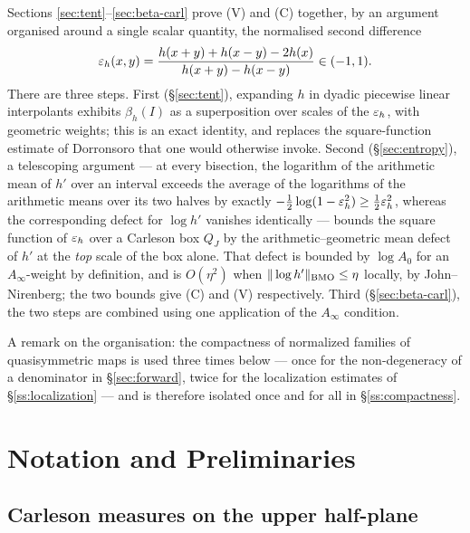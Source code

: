 Sections \ref{sec:tent}--\ref{sec:beta-carl} prove (V) and (C) together, by an
argument organised around a single scalar quantity, the normalised second
difference
\[
\varepsilon_h(x,y)=\frac{h(x+y)+h(x-y)-2h(x)}{h(x+y)-h(x-y)}\in(-1,1).
\]
There are three steps. First (\S\ref{sec:tent}), expanding $h$ in dyadic
piecewise linear interpolants exhibits $\beta_h(I)$ as a superposition over
scales of the $\varepsilon_h$, with geometric weights; this is an exact identity, and
replaces the square-function estimate of Dorronsoro that one would otherwise
invoke. Second (\S\ref{sec:entropy}), a telescoping argument --- at every
bisection, the logarithm of the arithmetic mean of $h'$ over an interval
exceeds the average of the logarithms of the arithmetic means over its two
halves by exactly $-\frac12\log(1-\varepsilon_h^2)\ge\frac12\varepsilon_h^2$, whereas the
corresponding defect for $\log h'$ vanishes identically --- bounds
the square function of $\varepsilon_h$ over a Carleson box $Q_J$ by the
arithmetic--geometric mean defect of $h'$ at the \emph{top} scale of the box
alone. That defect is bounded by $\log A_0$ for an $A_\infty$-weight by
definition, and is $O(\eta^2)$ when $\|\log h'\|_{\mathrm{BMO}}\le\eta$ locally, by
John--Nirenberg; the two bounds give (C) and (V) respectively. Third
(\S\ref{sec:beta-carl}), the two steps are combined using one application of
the $A_\infty$ condition.

A remark on the organisation: the compactness of normalized families of
quasisymmetric maps is used three times below --- once for the non-degeneracy
of a denominator in \S\ref{sec:forward}, twice for the localization estimates
of \S\ref{ss:localization} --- and is therefore isolated once and for all in
\S\ref{ss:compactness}.

\section{Notation and Preliminaries}\label{sec:prelim}

\subsection{Carleson measures on the upper half-plane}

